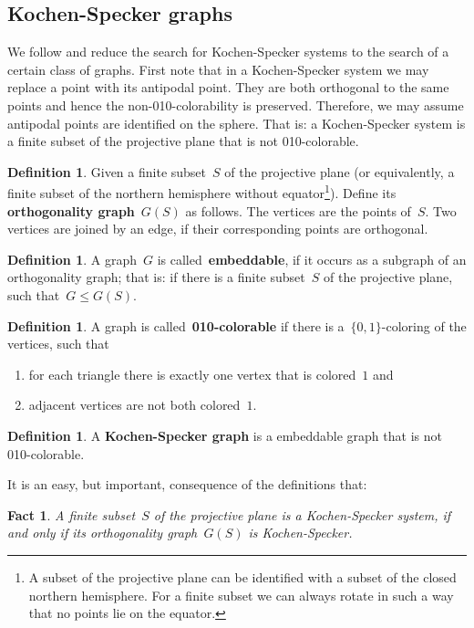 \documentclass[adraft,copyright,creativecommons]{eptcs}
\newcommand{\keyword}[1]{\textbf{#1}}
\newcounter{main}
\newtheorem{fact}[main]{Fact}
\theoremstyle{definition}
\newtheorem{dfn}[main]{Definition}
\theoremstyle{remark}
\begin{document}
\subsection{Kochen-Specker graphs}
\label{sec:ksgraphs}
We follow \cite{aow11} and reduce the search for Kochen-Specker systems
to the search of a certain class of graphs.
First note that in a Kochen-Specker system we may replace a point with its
antipodal point.  They are both orthogonal to the same points and hence
the non-010-colorability is preserved.
Therefore, we may assume antipodal points are identified on the sphere.
That is: a Kochen-Specker system is a finite subset of the projective plane
that is not 010-colorable.

\begin{dfn}
Given a finite subset~$S$ of the projective plane
(or equivalently, a finite subset of the northern
hemisphere without equator\footnote{%
    A subset of the projective plane can be identified with
    a subset of the closed northern hemisphere.
    For a finite subset we can always rotate in such a way
    that no points lie on the equator.}).
Define its \keyword{orthogonality graph}~$G(S)$ as follows.
The vertices are the points of~$S$.
Two vertices are joined by an edge, if their corresponding points
are orthogonal.
\end{dfn}
\begin{dfn}
A graph~$G$ is called~\keyword{embeddable},
if it occurs as a subgraph of an orthogonality graph;
that is: if there is a finite subset~$S$ of the projective plane,
such that~$G \leq G(S)$.
\end{dfn}
\begin{dfn}
A graph is called~\keyword{010-colorable}
if there is a~$\{0,1\}$-coloring of the vertices,
such that
\begin{enumerate}
\item
for each triangle there is exactly one vertex that is colored~$1$ and
\item
adjacent vertices are not both colored~$1$.
\end{enumerate}
\end{dfn}
\begin{dfn}
A \keyword{Kochen-Specker graph}
is a embeddable graph that is not 010-colorable.
\end{dfn}
It is an easy, but important, consequence of the definitions that:
\begin{fact}
    A finite subset~$S$ of the projective plane
    is a Kochen-Specker system,
    if and only if its orthogonality graph~$G(S)$
    is Kochen-Specker.
\end{fact}
\end{document}
